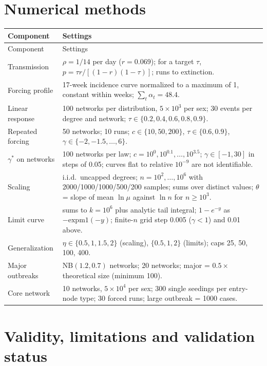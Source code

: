 \documentclass[11pt,a4paper]{article}
\theoremstyle{definition}
\theoremstyle{remark}
\begin{document}
\section{Numerical methods}
\begin{longtable}{p{3.2cm}p{11.8cm}}
\toprule Component & Settings \\ \midrule \endfirsthead
\toprule Component & Settings \\ \midrule \endhead
Transmission & $\rho=1/14$ per day ($r=0.069$); for a target $\tau$, $p=\tau r/[(1-r)(1-\tau)]$; runs to extinction. \\
Forcing profile & 17-week incidence curve normalized to a maximum of 1, constant within weeks; $\sum_t\alpha_t=48.4$. \\
Linear response & 100 networks per distribution, $5\times10^3$ per sex; 30 events per degree and network; $\tau\in\{0.2,0.4,0.6,0.8,0.9\}$. \\
Repeated forcing & 50 networks; 10 runs; $c\in\{10,50,200\}$, $\tau\in\{0.6,0.9\}$, $\gamma\in\{-2,-1.5,\dots,6\}$. \\
$\gamma^*$ on networks & 100 networks per law; $c=10^{0},10^{0.1},\dots,10^{3.5}$; $\gamma\in[-1,30]$ in steps of 0.05; curves flat to relative $10^{-9}$ are not identifiable. \\
Scaling & i.i.d.\ uncapped degrees; $n=10^2,\dots,10^6$ with 2000/1000/1000/500/200 samples; sums over distinct values; $\theta$ = slope of mean $\ln\mu$ against $\ln n$ for $n\ge10^3$. \\
Limit curve & sums to $k=10^6$ plus analytic tail integral; $1-e^{-y}$ as $-\mathrm{expm1}(-y)$; finite-$n$ grid step 0.005 ($\gamma<1$) and 0.01 above. \\
Generalization & $\eta\in\{0.5,1,1.5,2\}$ (scaling), $\{0.5,1,2\}$ (limits); caps 25, 50, 100, 400. \\
Major outbreaks & NB$(1.2,0.7)$ networks; 20 networks; major = $0.5\times$ theoretical size (minimum 100). \\
Core network & 10 networks, $5\times10^4$ per sex; 300 single seedings per entry-node type; 30 forced runs; large outbreak = 1000 cases. \\
\bottomrule
\end{longtable}

\section{Validity, limitations and validation status}\label{sec:validation}
\end{document}
